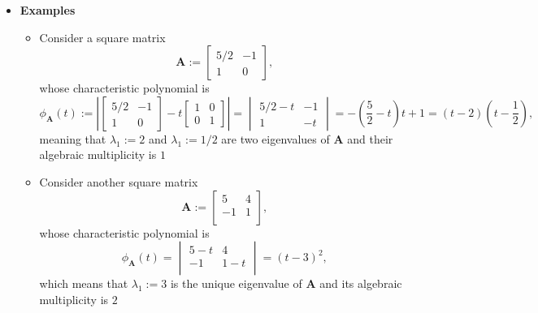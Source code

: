 \documentclass[12pt,a4paper]{article}
\begin{document}
\begin{itemize}
\begin{itemize}
  \end{itemize}

\item \textbf{Examples}
  \begin{itemize}
  \item Consider a square matrix
    \begin{equation}\nonumber%
      \bm{A} :=
      \begin{bmatrix}
        5/2 & -1 \\
        1 & 0
      \end{bmatrix},
    \end{equation}
    whose characteristic polynomial is
    \begin{equation}\nonumber%
      \phi_{\bm{A}}(t) :=
      \left|
      \begin{bmatrix}
        5/2 & -1 \\
        1 & 0
      \end{bmatrix}
      - t
      \begin{bmatrix}
        1 & 0 \\
        0 & 1
      \end{bmatrix}
      \right|
      = 
      \begin{vmatrix}
        5/2 - t & -1 \\
        1 & - t
      \end{vmatrix}
      = - \left(\frac{5}{2} - t\right)t + 1
      = (t - 2) \left(t - \frac{1}{2}\right),
    \end{equation}
    meaning that
    $\lambda_{1}:=2$ and $\lambda_{1}:=1/2$
    are two eigenvalues of $\bm{A}$
    and their algebraic multiplicity is $1$

  \item Consider another square matrix
    \begin{equation}\nonumber%
      \bm{A} :=
      \begin{bmatrix}
        5 & 4 \\
        -1 & 1 \\
      \end{bmatrix},
    \end{equation}
    whose characteristic polynomial is
    \begin{equation}\nonumber%
      \phi_{\bm{A}}(t) =
      \begin{vmatrix}
        5-t & 4 \\
        -1 & 1-t \\
      \end{vmatrix}
      =
      (t-3)^{2},
    \end{equation}
    which means that
    $\lambda_{1}:=3$
    is the unique eigenvalue of $\bm{A}$
    and its algebraic multiplicity is $2$

  \end{itemize}

\end{itemize}
\end{document}
